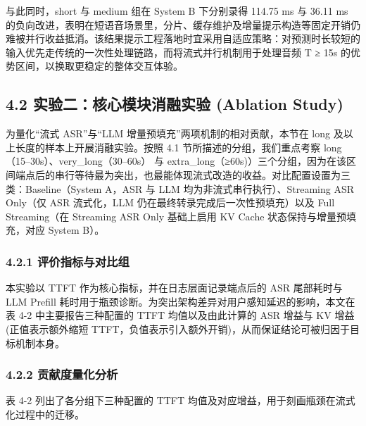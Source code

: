\documentclass[UTF8,a4paper,12pt]{ctexart}
\begin{document}
与此同时，short 与 medium 组在 System B 下分别录得 114.75 ms 与 36.11 ms 的负向改进，表明在短语音场景里，分片、缓存维护及增量提示构造等固定开销仍难被并行收益抵消。该结果提示工程落地时宜采用自适应策略：对预测时长较短的输入优先走传统的一次性处理链路，而将流式并行机制用于处理音频 T ≥ 15s 的优势区间，以换取更稳定的整体交互体验。

\subsection*{4.2 实验二：核心模块消融实验 (Ablation Study)}


为量化“流式 ASR”与“LLM 增量预填充”两项机制的相对贡献，本节在 long 及以上长度的样本上开展消融实验。按照 4.1 节所描述的分组，我们重点考察 long（15–30s）、very\_long（30–60s） 与 extra\_long（≥60s)）三个分组，因为在该区间端点后的串行等待最为突出，也最能体现流式改造的收益。对比配置设置为三类：Baseline（System A，ASR 与 LLM 均为非流式串行执行）、Streaming ASR Only（仅 ASR 流式化，LLM 仍在最终转录完成后一次性预填充）以及 Full Streaming（在 Streaming ASR Only 基础上启用 KV Cache 状态保持与增量预填充，对应 System B）。  

\subsubsection*{4.2.1 评价指标与对比组}


本实验以 TTFT 作为核心指标，并在日志层面记录端点后的 ASR 尾部耗时与 LLM Prefill 耗时用于瓶颈诊断。为突出架构差异对用户感知延迟的影响，本文在表 4-2 中主要报告三种配置的 TTFT 均值以及由此计算的 ASR 增益与 KV 增益(正值表示额外缩短 TTFT，负值表示引入额外开销)，从而保证结论可被归因于目标机制本身。

\subsubsection*{4.2.2 贡献度量化分析}


表 4-2 列出了各分组下三种配置的 TTFT 均值及对应增益，用于刻画瓶颈在流式化过程中的迁移。

\begin{table}[H]
\centering
\setlength{\tabcolsep}{4pt}
\renewcommand{\arraystretch}{1.2}
\scriptsize
{}
\end{table}
\end{document}
